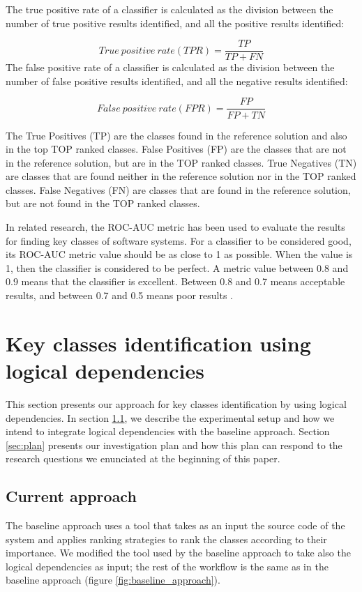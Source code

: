 \documentclass[runningheads]{comsis2}
\begin{document}
The true positive rate of a classifier is calculated as the division between the number of true positive results identified, and all the positive results identified:

\begin{equation}
 True\ positive\ rate (TPR) = \frac{TP}{TP+FN}
\end{equation}
The false positive rate of a classifier is calculated as the division between the number of false positive results identified, and all the negative results identified:

\begin{equation}
 False\ positive\ rate (FPR) = \frac{FP}{FP+TN}
\end{equation}

The True Positives (TP) are the classes found in the reference solution and also in the top TOP ranked classes. False Positives (FP) are the classes that are not in the reference solution, but are in the TOP ranked classes.
True Negatives (TN) are classes that are found neither in the reference solution nor in the TOP ranked classes. False Negatives (FN) are classes that are found in the reference solution, but are not found in the TOP ranked classes.

In related research, the ROC-AUC metric has been used to evaluate the results for finding key classes of software systems.
For a classifier to be considered good, its ROC-AUC metric value should be as close to 1 as possible.
When the value is 1, then the classifier is considered to be perfect. A metric value between 0.8 and 0.9 means that the classifier is excellent. Between 0.8 and 0.7 means acceptable results, and between 0.7 and 0.5 means poor results \cite{ROC_METRIC_VALS}. 


\section{Key classes identification using logical dependencies}
\label{sec:keycalss_identification}
This section presents our approach for key classes identification by using logical dependencies. 
In section \ref{sec:current_approach}, we describe the experimental setup and how we intend to integrate logical dependencies with the baseline approach. 
Section \ref{sec:plan} presents our investigation plan and how this plan can respond to the research questions we enunciated at the beginning of this paper.

\subsection{Current approach}
\label{sec:current_approach}
The baseline approach uses a tool that takes as an input the source code of the system and applies ranking strategies to rank the classes according to their importance. We modified the tool used by the baseline approach to take also the logical dependencies as input; the rest of the workflow is the same as in the baseline approach (figure \ref{fig:baseline_approach}).
\end{document}
